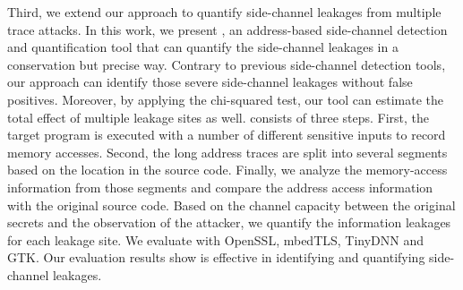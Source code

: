 Third, we extend our approach to quantify side-channel leakages from multiple trace attacks. In this work, we present \ctool{}, an address-based side-channel detection and quantification tool that can quantify the side-channel leakages in a conservation but precise way. Contrary to previous side-channel detection tools, our approach can identify those severe side-channel leakages without false positives. Moreover, by applying the chi-squared test, our tool can estimate the total effect of multiple leakage sites as well. \ctool{} consists of three steps. First, the target program is executed with a number of different sensitive inputs to record memory accesses. Second, the long address traces are split into several segments based on the location in the source code. Finally, we analyze the memory-access information from those segments and compare the address access information with the original source code. Based on the channel capacity between the original secrets and the observation of the attacker, we quantify the information leakages for each leakage site. We evaluate \ctool{} with OpenSSL, mbedTLS, TinyDNN and GTK. Our evaluation results show \ctool{} is effective in identifying and quantifying side-channel leakages.
